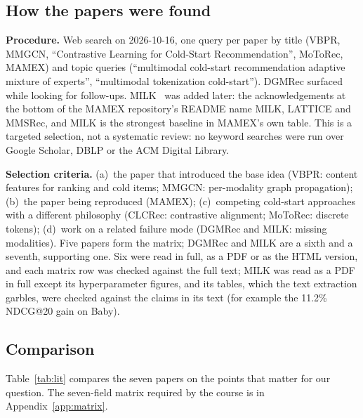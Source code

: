 \documentclass[conference]{IEEEtran}
\begin{document}
\subsection{How the papers were found}

\textbf{Procedure.} Web search on 2026-10-16, one query per paper by title (VBPR, MMGCN, ``Contrastive Learning for Cold-Start Recommendation'', MoToRec, MAMEX) and topic queries (``multimodal cold-start recommendation adaptive mixture of experts'', ``multimodal tokenization cold-start''). DGMRec surfaced while looking for follow-ups. MILK~\cite{bai2024milk} was added later: the acknowledgements at the bottom of the MAMEX repository's README name MILK, LATTICE and MMSRec, and MILK is the strongest baseline in MAMEX's own table. This is a targeted selection, not a systematic review: no keyword searches were run over Google Scholar, DBLP or the ACM Digital Library.

\textbf{Selection criteria.} (a)~the paper that introduced the base idea (VBPR: content features for ranking and cold items; MMGCN: per-modality graph propagation); (b)~the paper being reproduced (MAMEX); (c)~competing cold-start approaches with a different philosophy (CLCRec: contrastive alignment; MoToRec: discrete tokens); (d)~work on a related failure mode (DGMRec and MILK: missing modalities). Five papers form the matrix; DGMRec and MILK are a sixth and a seventh, supporting one. Six were read in full, as a PDF or as the HTML version, and each matrix row was checked against the full text; MILK was read as a PDF in full except its hyperparameter figures, and its tables, which the text extraction garbles, were checked against the claims in its text (for example the 11.2\% NDCG@20 gain on Baby).

\subsection{Comparison}

Table~\ref{tab:lit} compares the seven papers on the points that matter for our question. The seven-field matrix required by the course is in Appendix~\ref{app:matrix}.
\end{document}

